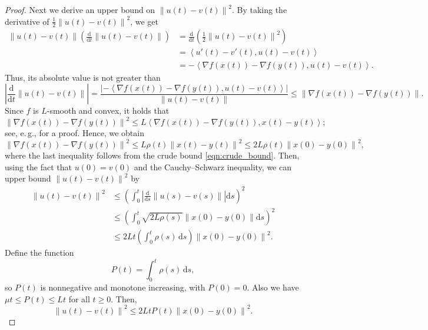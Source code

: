 \documentclass[11pt]{article}
\numberwithin{equation}{section}
\theoremstyle{definition}
\theoremstyle{plain}
\newcommand{\eg}{e.\,g.}
\newcommand{\dif}{\mathrm{d}}
\newcommand{\norm}[1]{\left\lVert #1 \right\rVert}
\newcommand{\ip}[2]{\left\langle #1 , #2 \right\rangle}
\newcommand{\grad}{\nabla}
\begin{document}
\begin{proof}
	Next we derive an upper bound on $\norm{u(t)-v(t)}^2$. 
	By taking the derivative of $\frac{1}{2} \norm{u(t)-v(t)}^2$, we get
	\begin{align*}
		\norm{u(t)-v(t)} \left( \frac{\dif}{\dif t} \norm{u(t)-v(t)} \right) 
		&= \frac{\dif}{\dif t} \left( \frac{1}{2} \norm{u(t)-v(t)}^2 \right)\\ 
		&= \ip{u'(t)-v'(t)}{u(t)-v(t)}\\ 
		&= - \ip{\grad f(x(t)) - \grad f(y(t))}{u(t)-v(t)}.
	\end{align*}
Thus, its absolute value is 
%
not greater than  %
	\[
	\left| \frac{\dif}{\dif t} \norm{u(t)-v(t)} \right| = \frac{\left| - \ip{\grad f(x(t)) - \grad f(y(t))}{u(t)-v(t)} \right|}{\norm{u(t)-v(t)}} \le \norm{\grad f(x(t)) - \grad f(y(t))}.
	\]
	Since $f$ is $L$-smooth and convex, it holds that 
	\[
	\norm{\grad f(x(t)) - \grad f(y(t))}^2 \le L \ip{\grad f(x(t)) - \grad f(y(t))}{x(t)-y(t)}; 
	\] 
	see, \eg, \cite[Lemma 4]{Zhou18} for a proof. Hence, we obtain 
	\[
	\norm{\grad f(x(t)) - \grad f(y(t))}^2 
	\le L\rho(t) \norm{x(t)-y(t)}^2 \le 2L\rho(t) \norm{x(0)-y(0)}^2,
	\]
	where the last inequality follows from the crude bound \eqref{eqn:crude_bound}. 
Then, using the fact that $u(0)=v(0)$ and the Cauchy--Schwarz inequality, we can upper bound $\norm{u(t)-v(t)}^2$ by
	\begin{align*}
		\norm{u(t)-v(t)}^2 
		&\le \left( \int_{0}^t \left| \frac{\dif}{\dif s} \norm{u(s)-v(s)} \right| \dif s \right)^2\\ 
		&\le \left( \int_{0}^t \sqrt{2L\rho(s)} \norm{x(0)-y(0)} \dif s \right)^2\\ 
		&\le 2L t \left( \int_{0}^t \rho(s) \,\dif s \right) \norm{x(0)-y(0)}^2. 
	\end{align*}
	Define the function
	\[
	P(t) = \int_{0}^t \rho(s) \,\dif s,
	\]
	so $P(t)$ is nonnegative and monotone increasing, with $P(0) = 0$. Also we have $\mu t \le P(t) \le Lt$ for all $t\geq 0$. Then, 
	\begin{equation}\label{eqn:bound_u-v}
	\norm{u(t)-v(t)}^2 \le 2Lt P(t) \norm{x(0)-y(0)}^2.
	\end{equation}
	

\end{proof}
\end{document}
